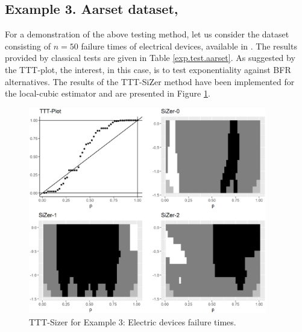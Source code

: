 \documentclass[preprint,12pt]{elsarticle}
\begin{document}
\subsection*{Example 3. Aarset dataset, \cite{A1987}}
For a demonstration of the above  testing method, let us consider the dataset consisting of $n=50$ failure times of electrical devices, available in \cite{A1987}. The results provided by classical tests are given in Table \ref{exp.test.aarset}.
As suggested by the TTT-plot, the interest, in this case, is to test exponentiality against BFR alternatives. The results of the TTT-SiZer method have been implemented for the local-cubic estimator and are presented in Figure \ref{Fig:aarset}. 
\begin{figure}[htb]
\begin{center}
\includegraphics[height= 9cm]{Fig4_aarsetCubicPuntual_log10}%
\caption{TTT-Sizer for Example 3: Electric devices failure times.}\label{Fig:aarset}
\end{center}
\end{figure}
\end{document}
